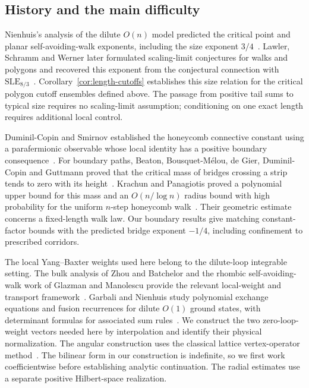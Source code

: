 \subsection{History and the main difficulty}

Nienhuis's analysis of the dilute $O(n)$ model predicted the critical
point and planar self-avoiding-walk exponents, including the size
exponent $3/4$~\cite{Nienhuis1982}. Lawler, Schramm and Werner later
formulated scaling-limit conjectures for walks and polygons and recovered
this exponent from the conjectural connection with
$\mathrm{SLE}_{8/3}$~\cite{LawlerSchrammWerner2004}.
Corollary~\ref{cor:length-cutoffs} establishes this size relation for the
critical polygon cutoff ensembles defined above. The passage from
positive tail sums to typical size requires no scaling-limit assumption;
conditioning on one exact length requires additional local control.

Duminil-Copin and Smirnov established the honeycomb connective constant
using a parafermionic observable whose local identity has a positive
boundary consequence~\cite{DuminilCopinSmirnov2012}. For boundary paths,
Beaton, Bousquet-M\'elou, de Gier, Duminil-Copin and Guttmann proved that
the critical mass of bridges crossing a strip tends to zero with its
height~\cite{BeatonEtAl2014}. Krachun and Panagiotis proved a polynomial
upper bound for this mass and an $O(n/\log n)$ radius bound with high
probability for the uniform $n$-step honeycomb
walk~\cite{KrachunPanagiotis2026}. Their geometric estimate concerns a
fixed-length walk law. Our boundary results give matching constant-factor
bounds with the predicted bridge exponent $-1/4$, including confinement
to prescribed corridors.

The local Yang--Baxter weights used here belong to the dilute-loop
integrable setting. The bulk analysis of Zhou and Batchelor and the
rhombic self-avoiding-walk work of Glazman and Manolescu provide the
relevant local-weight and transport
framework~\cite{ZhouBatchelor1997,GlazmanManolescu2017}.
Garbali and Nienhuis study polynomial exchange equations and fusion
recurrences for dilute $O(1)$ ground states, with determinant formulas
for associated sum rules~\cite{GarbaliNienhuis2017Ground,GarbaliNienhuis2017Sum}.
We construct the two zero-loop-weight vectors needed here by
interpolation and identify their physical normalization. The angular
construction uses the classical lattice vertex-operator
method~\cite{FrenkelKac1980,Segal1981,Frenkel1985}. The bilinear form in
our construction is indefinite, so we first work coefficientwise before
establishing analytic continuation. The radial estimates use a separate
positive Hilbert-space realization.

